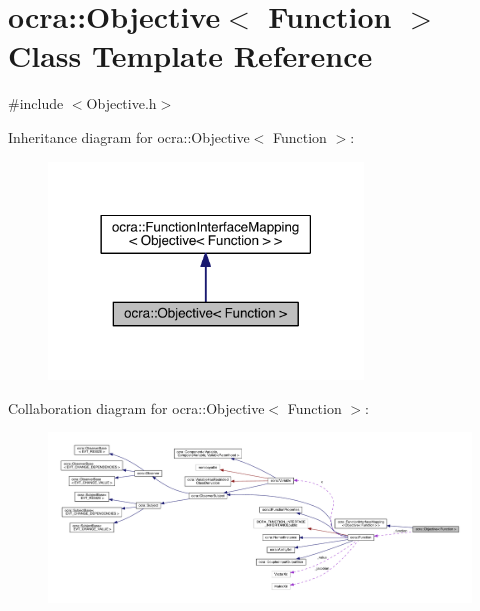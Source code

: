 \hypertarget{classocra_1_1Objective_3_01Function_01_4}{}\section{ocra\+:\+:Objective$<$ Function $>$ Class Template Reference}
\label{classocra_1_1Objective_3_01Function_01_4}


{\ttfamily \#include $<$Objective.\+h$>$}



Inheritance diagram for ocra\+:\+:Objective$<$ Function $>$\+:\nopagebreak
\begin{figure}[H]
\begin{center}
\leavevmode
\includegraphics[width=237pt]{d7/d76/classocra_1_1Objective_3_01Function_01_4__inherit__graph}
\end{center}
\end{figure}


Collaboration diagram for ocra\+:\+:Objective$<$ Function $>$\+:\nopagebreak
\begin{figure}[H]
\begin{center}
\leavevmode
\includegraphics[width=350pt]{dc/ddf/classocra_1_1Objective_3_01Function_01_4__coll__graph}
\end{center}
\end{figure}
